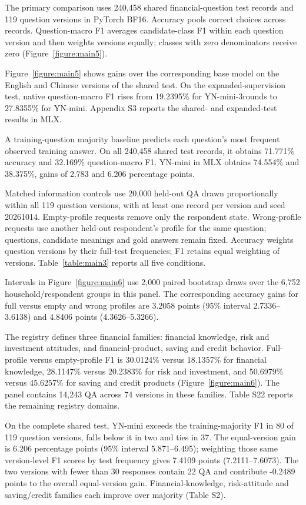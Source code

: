 \documentclass[10pt]{article}
\begin{document}
The primary comparison uses 240,458 shared financial-question test records and 119 question versions in PyTorch BF16. Accuracy pools correct choices across records. Question-macro F1 averages candidate-class F1 within each question version and then weights versions equally; classes with zero denominators receive zero (Figure~\ref{figure:main5}).

Figure~\ref{figure:main5} shows gains over the corresponding base model on the English and Chinese versions of the shared test. On the expanded-supervision test, native question-macro F1 rises from 19.2395\% for YN-mini-3rounds to 27.8355\% for YN-mini. Appendix S3 reports the shared- and expanded-test results in MLX.

A training-question majority baseline predicts each question's most frequent observed training answer. On all 240,458 shared test records, it obtains 71.771\% accuracy and 32.169\% question-macro F1. YN-mini in MLX obtains 74.554\% and 38.375\%, gains of 2.783 and 6.206 percentage points.


Matched information controls use 20,000 held-out QA drawn proportionally within all 119 question versions, with at least one record per version and seed 20261014. Empty-profile requests remove only the respondent state. Wrong-profile requests use another held-out respondent's profile for the same question; questions, candidate meanings and gold answers remain fixed. Accuracy weights question versions by their full-test frequencies; F1 retains equal weighting of versions. Table~\ref{table:main3} reports all five conditions.

Intervals in Figure~\ref{figure:main6} use 2,000 paired bootstrap draws over the 6,752 household/respondent groups in this panel. The corresponding accuracy gains for full versus empty and wrong profiles are 3.2058 points (95\% interval 2.7336–3.6138) and 4.8406 points (4.3626–5.3266).

The registry defines three financial families: financial knowledge, risk and investment attitudes, and financial-product, saving and credit behavior. Full-profile versus empty-profile F1 is 30.0124\% versus 18.1357\% for financial knowledge, 28.1147\% versus 20.2383\% for risk and investment, and 50.6979\% versus 45.6257\% for saving and credit products (Figure~\ref{figure:main6}). The panel contains 14,243 QA across 74 versions in these families. Table S22 reports the remaining registry domains.


On the complete shared test, YN-mini exceeds the training-majority F1 in 80 of 119 question versions, falls below it in two and ties in 37. The equal-version gain is 6.206 percentage points (95\% interval 5.871–6.495); weighting those same version-level F1 scores by test frequency gives 7.4109 points (7.2111–7.6073). The two versions with fewer than 30 responses contain 22 QA and contribute -0.2489 points to the overall equal-version gain. Financial-knowledge, risk-attitude and saving/credit families each improve over majority (Table S2).
\end{document}
